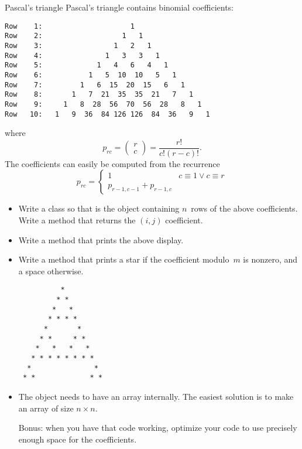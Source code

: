 \begin{block}{Pascal's triangle}
  \label{sl:pascal-def}
  \small
  Pascal's triangle contains binomial coefficients:
\begin{verbatim}
Row    1:                     1
Row    2:                   1   1
Row    3:                 1   2   1
Row    4:               1   3   3   1
Row    5:             1   4   6   4   1
Row    6:           1   5  10  10   5   1
Row    7:         1   6  15  20  15   6   1
Row    8:       1   7  21  35  35  21   7   1
Row    9:     1   8  28  56  70  56  28   8   1
Row   10:   1   9  36  84 126 126  84  36   9   1
\end{verbatim}
where \[ p_{rc} = \begin{pmatrix} r\\c \end{pmatrix} = \frac{r!}{c!(r-c)! }. \]
The coefficients can easily be computed from the recurrence
\[ p_{rc} = 
\begin{cases}
  1&c\equiv 1\vee c\equiv r\\
  p_{r-1,c-1}+p_{r-1,c}
\end{cases}
\]
\end{block}

\begin{exercise}
  \label{ex:pascal-ex}
  \small
  \begin{itemize}
  \item 
    Write a class  so that  is the object
    containing $n$~rows of the above coefficients. Write a method
     that returns the $(i,j)$ coefficient.
  \item
    Write a method  that prints the above display.
  \item
    Write a method  that prints a star if the
    coefficient modulo~$m$ is nonzero, and a space otherwise.
\begin{verbatim}
          *
         * *
        *   *
       * * * *
      *       *
     * *     * *
    *   *   *   *
   * * * * * * * *
  *               *
 * *             * *
\end{verbatim}
  \item
    The object needs to have an array internally. The easiest solution
    is to make an array of size $n\times n$.

    Bonus: when you have that code working, optimize your code to use
    precisely enough space for the coefficients.
  \end{itemize}
\end{exercise}

